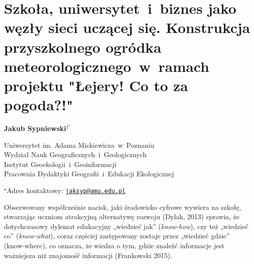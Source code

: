 \documentclass[\main/boa.tex]{subfiles}
\begin{document}
\section{Szkoła, uniwersytet~i~biznes jako węzły sieci uczącej się. Konstrukcja przyszkolnego ogródka meteorologicznego~w~ramach projektu "Łejery! Co to za pogoda?!"}

\begin{center}
  {\bf {} Jakub Sypniewski$^{1^\star}$}
\end{center}

\vskip 0.3cm

\begin{affiliations}
\begin{enumerate}
\begin{minipage}{0.915\textwidth}
\centering
\item Uniwersytet im. Adama Mickiewicza~w~Poznaniu\\ Wydział Nauk Geograficznych~i~Geologicznych\\ Instytut Geoekologii~i~Geoinformacji \\ Pracownia Dydaktyki Geografii~i~Edukacji Ekologicznej\\[-2pt]
\end{minipage}
\end{enumerate}
$^\star$Adres kontaktowy: \href{mailto:jaksyp@amu.edu.pl}{\nolinkurl{jaksyp@amu.edu.pl}}\\
\end{affiliations}

\vskip 0.5cm


\vskip 0.5cm

Obserwowany współcześnie nacisk, jaki środowisko cyfrowe wywiera na szkołę, stwarzając uczniom atrakcyjną alternatywę rozwoju (Dylak, 2013) sprawia, że dotychczasowy dylemat edukacyjny „wiedzieć jak” (\emph{know-how}), czy też „wiedzieć co” (\emph{know-what}), coraz częściej zastępowany zostaje przez „wiedzieć gdzie”  (know-where), co oznacza, że wiedza o tym, gdzie znaleźć informacje jest ważniejsza niż znajomość informacji (Frankowski 2015).
\end{document}
